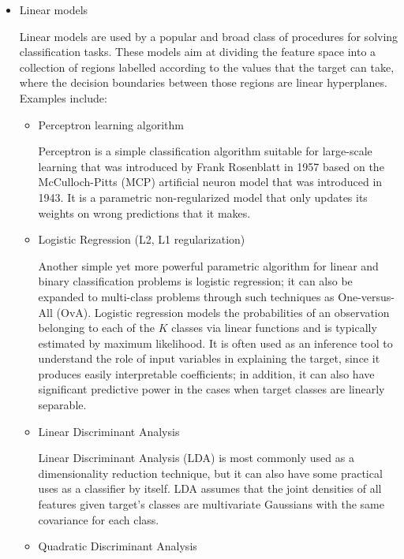 \begin{itemize}
    \item Linear models

    Linear models are used by a popular and broad class of procedures for solving classification tasks.
    These models aim at dividing the feature space into a collection of regions labelled according to the values that the target can take, where the decision boundaries between those regions are linear hyperplanes.
    Examples include:

    \begin{itemize}
        \item Perceptron learning algorithm

        Perceptron is a simple classification algorithm suitable for large-scale learning that was introduced by Frank Rosenblatt\cite{Rosenblatt1957a} in 1957 based on the McCulloch-Pitts (MCP) artificial neuron model\cite{McCulloch1990a} that was introduced in 1943.
        It is a parametric non-regularized model that only updates its weights on wrong predictions that it makes.

        \item Logistic Regression (L2, L1 regularization)

        Another simple yet more powerful parametric algorithm for linear and binary classification problems is logistic regression;
        it can also be expanded to multi-class problems through such techniques as One-versus-All (OvA).
        Logistic regression models the probabilities of an observation belonging to each of the $K$ classes via linear functions and is typically estimated by maximum likelihood.
        It is often used as an inference tool to understand the role of input variables in explaining the target, since it produces easily interpretable coefficients;
        in addition, it can also have significant predictive power in the cases when target classes are linearly separable\cite{RaschkaMirjalili2017}.

        \item Linear Discriminant Analysis

        Linear Discriminant Analysis (LDA) is most commonly used as a dimensionality reduction technique, but it can also have some practical uses as a classifier by itself.
        LDA assumes that the joint densities of all features given target's classes are multivariate Gaussians with the same covariance for each class.

        \item Quadratic Discriminant Analysis


\end{itemize}
\end{itemize}
